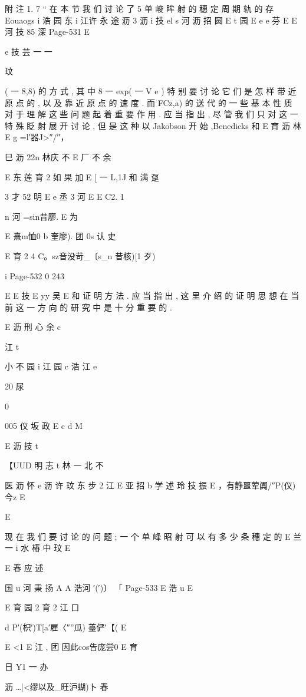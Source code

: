 {{附 注 1. 7 “ 在 本 节 我 们 讨 论 了 5 单 峻 眸 射 的 穗 定 周 期 轨 的 存
Eouaogs i 浩 园 东 i 江许 永 途 沥 3
沥 i 技
el s 河 沥 招 圆
E t 园
E
e
e 芬
E
E 河 技 85 深
Page-531
E

e 技 芸 一 一

玟

( 一 8,8) 的 方 式 , 其 中 8 一 exp( 一 V e ) 特 别 要 讨 论 它 们 是 怎 样
带 近 原 点 的 , 以 及 靠 近 原 点 的 速 度 . 而 FCz,a) 的 送 代 的 一 些 基 本
性 质 对 于 理 解 这 些 问 题 起 着 重 要 作 用 . 应 当 指 出 , 尽 管 我 们 只 对 这
一 特 殊 眨 射 展 开 讨 论 , 但 是 这 种 以 Jakobson 开 始 ,Benedicks 和
E 育 沥 林 E
g =l′器J>″/″，

巳 沥 22n 林庆 不
E 厂 不 余

E 东 莲 育 2
如 果 加 E [ 一 L,1J 和 满 趸

3 才 52 明
E
e 丞 3 河
E
E C2. 1

n 河 =sin昔廖. E
为

E 熹m恤0 b 奎廖).
团
0s 认 史

E 育 2
4 C。sz音没苛_〔s_n 昔核)[1 歹)

i
Page-532
0 243

E
E 技
E yy 吴 E
和 证 明 方 法 . 应 当 指 出 , 这 里 介 绍 的 证 明 思 想 在 当 前 这 一 方 向 的 研
究 中 是 十 分 重 要 的 .

E 沥 刑 心 余 c

江
t

小 不 园 i 江 园 c 浩 江
e

20 尿

0

005 仪 坂 政 E c d M

E 沥 技 t

【UUD 明 志 t 林 一 北 不

医 沥 怀 e 沥 许 玟 东 步 2 江
E 亚 招
b 学 述 玲 技 振
E ，有静噩荤阗/″P(仪)今z E

E

现 在 我 们 要 讨 论 的 问 题 ; 一 个 单 峰 昭 射 可 以 有 多 少 条 穗 定 的
E 兰 一 i 水 椿 中
玟
E

E 春 应 述

国 u 河 秉 扬 A
A 浩河 ′(′)〕 「
Page-533
E 浩 u E

E 育
园 2 育 2 江 口

d P′(枳′)T[a′雇〈″”瓜) 薹俨′【(%
E

E <1 E 江 ,
团 因此cos告庞尝0 E 育

日
Y1 一 办

沥 …|<缪以及_旺沪蝴)卜 春

}}
